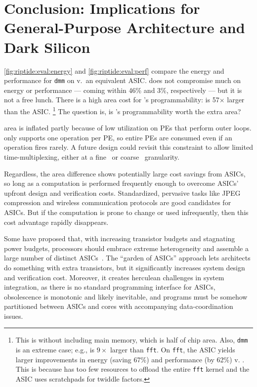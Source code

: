 \section{Conclusion: Implications for General-Purpose Architecture and Dark Silicon}
\label{riptide:implications}

\autoref{fig:riptide:eval:energy} and \autoref{fig:riptide:eval:perf} compare the energy and performance for {\tt dmm} on \riptide v.\ an equivalent ASIC.
%
\riptide does not compromise much on energy or performance --- coming within 46\% and 3\%, respectively --- but it is not a free lunch.
%
There is a high area cost for \riptide's programmability: \riptide is 57$\times$ larger than the ASIC.%
\footnote{This is without including main memory, which is half of chip area. Also, {\tt dmm} is an extreme case; e.g., \riptide is $9\times$ larger than {\tt fft}. On {\tt fft}, the ASIC yields larger improvements in energy (saving 67\%) and performance (by 62\%) v. \riptide. This is because \riptide has too few resources to offload the entire {\tt fft} kernel and the ASIC uses scratchpads for twiddle factors.}
%
The question is, is \riptide's programmability worth the extra area?

\riptide area is inflated partly because of low utilization on PEs that perform outer loops.
%
\riptide only supports one operation per PE, so entire PEs are consumed even if an operation fires rarely.
%
A future design could revisit this constraint to allow limited time-multiplexing,
either at a fine~\cite{weng2020hybrid} or coarse~\cite{nguyen2021fifer} granularity.

Regardless, the area difference shows potentially large cost savings from ASICs,
so long as a computation is performed frequently enough to overcome
ASICs' upfront design and verification costs.
%
Standardized, pervasive tasks like JPEG compression and wireless communication protocols are good candidates for ASICs.
%
But if the computation is prone to change
or used infrequently, then this cost advantage rapidly disappears.

Some have proposed that, with increasing transistor budgets and
stagnating power budgets, processors should embrace extreme
heterogeneity and assemble a large number of distinct
ASICs~\cite{venkatesh2010conservation,taylor2012dark}.
%
The ``garden of ASICs'' approach lets architects do something
with extra transistors, but it significantly increases
system design and verification cost.
%
Moreover, it creates herculean
challenges in system integration,
%
as there is no standard programming interface for ASICs,
obsolescence is monotonic and likely inevitable,
and programs must be somehow partitioned between ASICs
and cores with accompanying data-coordination issues.

